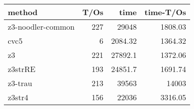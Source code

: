 \begin{tabular}{lrrr}
\hline
 method            &   T/Os &     time &   time-T/Os \\
\hline
 z3-noodler-common &    227 & 29048    &     1808.03 \\
 cvc5              &      6 &  2084.32 &     1364.32 \\
 z3                &    221 & 27892.1  &     1372.06 \\
 z3strRE           &    193 & 24851.7  &     1691.74 \\
 z3-trau           &    213 & 39563    &    14003    \\
 z3str4            &    156 & 22036    &     3316.05 \\
\hline
\end{tabular}
